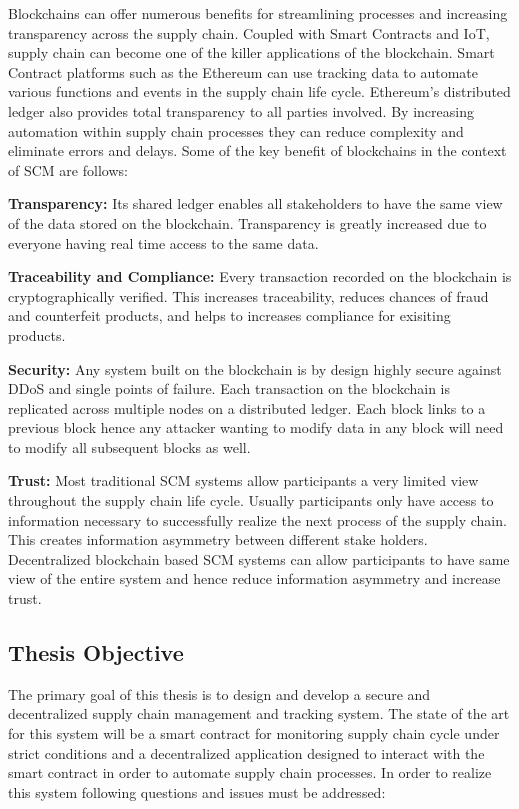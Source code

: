 Blockchains can offer numerous benefits for streamlining processes and increasing transparency across the supply chain. Coupled with Smart Contracts and IoT, supply chain can become one of the killer applications of the blockchain. Smart Contract platforms such as the Ethereum can use tracking data to automate various functions and events in the supply chain life cycle. Ethereum’s distributed ledger also provides total transparency to all parties involved. By increasing automation within supply chain processes they can reduce complexity and eliminate errors and delays. Some of the key benefit of blockchains in the context of SCM are follows:

\textbf{Transparency:}
Its shared ledger enables all stakeholders to have the same view of the data stored on the blockchain. Transparency is greatly increased due to everyone having real time access to the same data.

\textbf{Traceability and Compliance:}
Every transaction recorded on the blockchain is cryptographically verified. This increases traceability, reduces chances of fraud and counterfeit products, and helps to increases compliance for exisiting products. 

\textbf{Security:}
Any system built on the blockchain is by design highly secure against DDoS and single points of failure. Each transaction on the blockchain is replicated across multiple nodes on a distributed ledger. Each block links to a previous block hence any attacker wanting to modify data in any block will need to modify all subsequent blocks as well.

\textbf{Trust:}
Most traditional SCM systems allow participants a very limited view throughout the supply chain life cycle. Usually participants only have access to information necessary to successfully realize the next process of the supply chain. This creates information asymmetry between different stake holders. Decentralized blockchain based SCM systems can allow participants to have same view of the entire system and hence reduce information asymmetry and increase trust.
\clearpage

\subsection{Thesis Objective}
The primary goal of this thesis is to design and develop a secure and decentralized supply chain management and tracking system. The state of the art for this system will be a smart contract for monitoring supply chain cycle under strict conditions and a decentralized application designed to interact with the smart contract in order to automate supply chain processes. In order to realize this system following questions and issues must be addressed:

